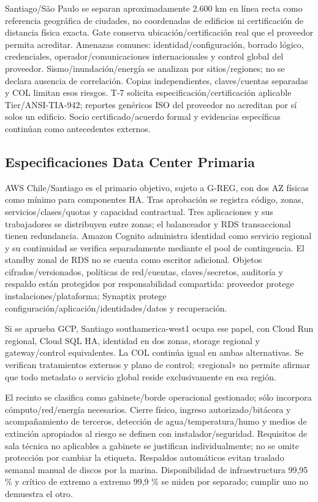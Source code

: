 \documentclass[11pt,letterpaper]{report}
\begin{document}
Santiago/São Paulo se separan aproximadamente 2.600 km en línea recta como referencia geográfica de ciudades, no coordenadas de edificios ni certificación de distancia física exacta. Gate conserva ubicación/certificación real que el proveedor permita acreditar. Amenazas comunes: identidad/configuración, borrado lógico, credenciales, operador/comunicaciones internacionales y control global del proveedor. Sismo/inundación/energía se analizan por sitios/regiones; no se declara ausencia de correlación. Copias independientes, claves/cuentas separadas y COL limitan esos riesgos. T-7 solicita especificación/certificación aplicable Tier/ANSI-TIA-942; reportes genéricos ISO del proveedor no acreditan por sí solos un edificio. Socio certificado/acuerdo formal y evidencias específicas continúan como antecedentes externos.

\subsection{Especificaciones Data Center Primaria}
AWS Chile/Santiago es el primario objetivo, sujeto a G-REG, con dos AZ físicas como mínimo para componentes HA. Tras aprobación se registra código, zonas, servicios/clases/quotas y capacidad contractual. Tres aplicaciones y sus trabajadores se distribuyen entre zonas; el balanceador y RDS transaccional tienen redundancia. Amazon Cognito administra identidad como servicio regional y su continuidad se verifica separadamente mediante el pool de contingencia. El standby zonal de RDS no se cuenta como escritor adicional. Objetos cifrados/versionados, políticas de red/cuentas, claves/secretos, auditoría y respaldo están protegidos por responsabilidad compartida: proveedor protege instalaciones/plataforma; Synaptix protege configuración/aplicación/identidades/datos y recuperación.

Si se aprueba GCP, Santiago southamerica-west1 ocupa ese papel, con Cloud Run regional, Cloud SQL HA, identidad en dos zonas, storage regional y gateway/control equivalentes. La COL continúa igual en ambas alternativas. Se verifican tratamientos externos y plano de control; «regional» no permite afirmar que todo metadato o servicio global reside exclusivamente en esa región.

El recinto se clasifica como gabinete/borde operacional gestionado; sólo incorpora cómputo/red/energía necesarios. Cierre físico, ingreso autorizado/bitácora y acompañamiento de terceros, detección de agua/temperatura/humo y medios de extinción apropiados al riesgo se definen con instalador/seguridad. Requisitos de sala técnica no aplicables a gabinete se justifican individualmente; no se omite protección por cambiar la etiqueta. Respaldos automáticos evitan traslado semanal manual de discos por la marina. Disponibilidad de infraestructura 99,95 \% y crítico de extremo a extremo 99,9 \% se miden por separado; cumplir uno no demuestra el otro.
\end{document}
